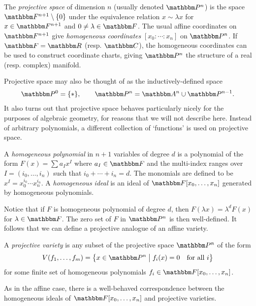 \documentclass[11pt,titlepage]{article}
\newcommand*{\vbar}{\;\big\vert\;}
\begin{document}
    \begin{definition}
        The \emph{projective space} of dimension $n$ (usually denoted $\Proj^n$)
        is the space $\F^{n+1}\setminus \{0\}$ under the equivalence relation $x
        \sim \lambda x$ for $x \in \F^{n+1}$ and $0 \ne \lambda \in \F$.  The
        usual affine coordinates on $\F^{n+1}$ give \emph{homogeneous
        coordinates} $[x_0: \cdots: x_n]$ on $\Proj^n$.  If $\F = \R$ (resp.
        $\C$), the homogeneous coordinates can be used to construct coordinate
        charts, giving $\Proj^n$ the structure of a real (resp. complex)
        manifold.
    \end{definition}

    Projective space may also be thought of as the inductively-defined space
    \[
        \Proj^0 = \{\ast\}, \qquad \Proj^n = \A^n \cup \Proj^{n-1}.
    \]
    It also turns out that projective space behaves particularly nicely for the
    purposes of algebraic geometry, for reasons that we will not describe here.
    Instead of arbitrary polynomials, a different collection of `functions' is
    used on projective space.
    \begin{definition}
        A \emph{homogeneous polynomial} in $n+1$ variables of degree $d$ is a
        polynomial of the form $F(x) = \sum a_I x^I$ where $a_I \in \F$ and the
        multi-index ranges over $I = (i_0, \ldots, i_n)$ such that $i_0 + \cdots
        + i_n = d$.  The monomials are defined to be $x^I = x_0^{i_0}\cdots
        x_n^{i_n}$.  A \emph{homogeneous ideal} is an ideal of $\F[x_0, \ldots,
        x_n]$ generated by homogeneous polynomials.
    \end{definition}
    Notice that if $F$ is homogeneous polynomial of degree $d$, then $F(\lambda
    x) = \lambda^d F(x)$ for $\lambda \in \F$.  The zero set of $F$ in $\Proj^n$
    is then well-defined.  It follows that we can define a projective analogue
    of an affine variety.
    \begin{definition}
        A \emph{projective variety} is any subset of the projective space
        $\Proj^n$ of the form
        \[
            V(f_1, \ldots, f_m)
            = \cdil[\big]{x \in \Proj^n \vbar f_i(x) = 0 \quad\text{for all $i$}}
        \]
        for some finite set of homogeneous polynomials $f_i \in \F[x_0,
        \ldots,x_n]$.
    \end{definition}
    As in the affine case, there is a well-behaved correspondence between the
    homogeneous ideals of $\F[x_0, \ldots, x_n]$ and projective varieties.
\end{document}
